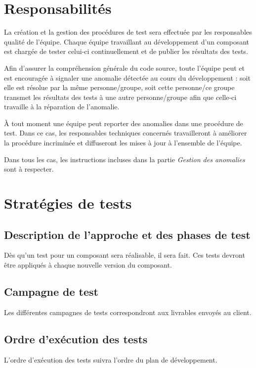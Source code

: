 \documentclass{../res/univ-projet}
\begin{document}
\section{Responsabilités}

  La création et la gestion des procédures de test sera effectuée par les responsables qualité de l'équipe. Chaque équipe travaillant au développement d'un composant est chargée de tester celui-ci continuellement et de publier les résultats des tests.
  
  Afin d'assurer la compréhension générale du code source, toute l'équipe peut et est encouragée à signaler une anomalie détectée au cours du développement : soit elle est résolue par la même personne/groupe, soit cette personne/ce groupe transmet les résultats 
  des tests à une autre personne/groupe afin que celle-ci travaille à la réparation de l'anomalie.
  
  À tout moment une équipe peut reporter des anomalies dans une procédure de test. Dans ce cas, les responsables techniques concernés travailleront à améliorer la procédure incriminée et diffuseront les mises à jour à l'ensemble de l'équipe.

  Dans tous les cas, les instructions incluses dans la partie \emph{Gestion des anomalies} sont à respecter.


\section{Stratégies de tests}

\subsection{Description de l'approche et des phases de test}
Dès qu'un test pour un composant sera réalisable, il sera fait. Ces tests devront être appliqués à chaque nouvelle version du composant.


\subsection{Campagne de test}

Les différentes campagnes de tests correspondront aux livrables envoyés au client.

\subsection{Ordre d'exécution des tests}

L'ordre d'exécution des tests suivra l'ordre du plan de développement.
\end{document}
